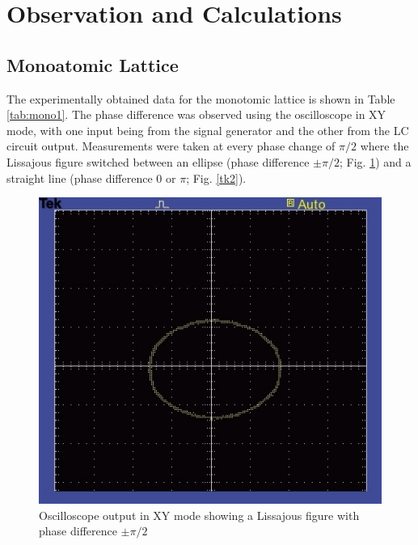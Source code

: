 \section{Observation and Calculations}
\subsection{Monoatomic Lattice}
The experimentally obtained data for the monotomic
lattice is shown in Table \ref{tab:mono1}. The phase difference was observed using the oscilloscope in XY mode, with one input being from the signal generator and the other from the LC circuit output. Measurements were taken at every phase change of $\pi/2$ where the Lissajous figure switched between an ellipse (phase difference $\pm \pi/2$; Fig. \ref{tk1}) and a straight line (phase difference 0 or $\pi$; Fig. \ref{tk2}).

\begin{figure}[H]
    \centering
    \includegraphics[width=.8\columnwidth]{images/TEK0000.JPG}
    \caption{Oscilloscope output in XY mode showing a Lissajous figure with phase difference $\pm \pi/2$}
    \label{tk1}
\end{figure}

